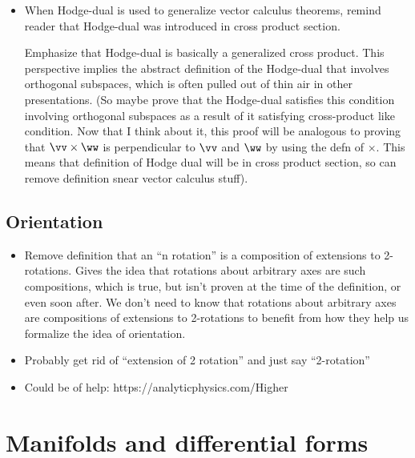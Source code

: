 \begin{itemize}
    \item When Hodge-dual is used to generalize vector calculus theorems, remind reader that Hodge-dual was introduced in cross product section. 
    
    Emphasize that Hodge-dual is basically a generalized cross product. This perspective implies the abstract definition of the Hodge-dual that involves orthogonal subspaces, which is often pulled out of thin air in other presentations. (So maybe prove that the Hodge-dual satisfies this condition involving orthogonal subspaces as a result of it satisfying cross-product like condition. Now that I think about it, this proof will be analogous to proving that $\vv \times \ww$ is perpendicular to $\vv$ and $\ww$ by using the defn of $\times$. This means that definition of Hodge dual will be in cross product section, so can remove definition snear vector calculus stuff).
\end{itemize}

\subsection*{Orientation}

\begin{itemize}
    \item Remove definition that an “n rotation” is a composition of extensions to 2-rotations. Gives the idea that rotations about arbitrary axes are such compositions, which is true, but isn’t proven at the time of the definition, or even soon after. We don’t need to know that rotations about arbitrary axes are compositions of extensions to 2-rotations to benefit from how they help us formalize the idea of orientation.
    \item Probably get rid of “extension of 2 rotation” and just say “2-rotation”
    \item Could be of help: https://analyticphysics.com/Higher%
\end{itemize}

\section*{Manifolds and differential forms}

